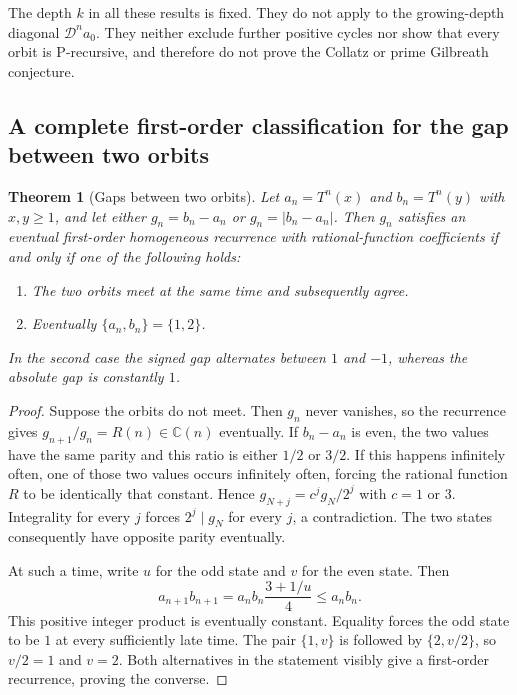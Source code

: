 \documentclass[11pt,a4paper]{article}
\newtheorem{theorem}{Theorem}[section]
\theoremstyle{definition}
\theoremstyle{remark}
\numberwithin{equation}{section}
\begin{document}
The depth $k$ in all these results is fixed. They do not apply to the
growing-depth diagonal $\mathcal D^n a_0$. They neither exclude further
positive cycles nor show that every orbit is P-recursive, and therefore
do not prove the Collatz or prime Gilbreath conjecture.

\subsection{A complete first-order classification for the gap between two orbits}

\begin{theorem}[Gaps between two orbits]
\label{A:thm:ucr-gap}
Let $a_n=T^n(x)$ and $b_n=T^n(y)$ with $x,y\geq1$, and let either
$g_n=b_n-a_n$ or $g_n=|b_n-a_n|$.
Then $g_n$ satisfies an eventual first-order homogeneous recurrence
with rational-function coefficients if and only if one of the following
holds:
\begin{enumerate}
\item The two orbits meet at the same time and subsequently agree.
\item Eventually $\{a_n,b_n\}=\{1,2\}$.
\end{enumerate}
In the second case the signed gap alternates between $1$ and $-1$,
whereas the absolute gap is constantly $1$.
\end{theorem}

\begin{proof}
Suppose the orbits do not meet. Then $g_n$ never vanishes, so the
recurrence gives $g_{n+1}/g_n=R(n)\in\mathbb C(n)$ eventually.
If $b_n-a_n$ is even, the two values have the same parity and this ratio
is either $1/2$ or $3/2$. If this happens infinitely often, one of those
two values occurs infinitely often, forcing the rational function $R$
to be identically that constant. Hence
$g_{N+j}=c^j g_N/2^j$ with $c=1$ or $3$.
Integrality for every $j$ forces $2^j\mid g_N$ for every $j$, a
contradiction. The two states consequently have opposite parity
eventually.

At such a time, write $u$ for the odd state and $v$ for the even state.
Then
\[
 a_{n+1}b_{n+1}=a_nb_n\frac{3+1/u}{4}\leq a_nb_n.
\]
This positive integer product is eventually constant. Equality forces
the odd state to be $1$ at every sufficiently late time.
The pair $\{1,v\}$ is followed by $\{2,v/2\}$, so $v/2=1$ and $v=2$.
Both alternatives in the statement visibly give a first-order
recurrence, proving the converse.
\end{proof}
\end{document}
